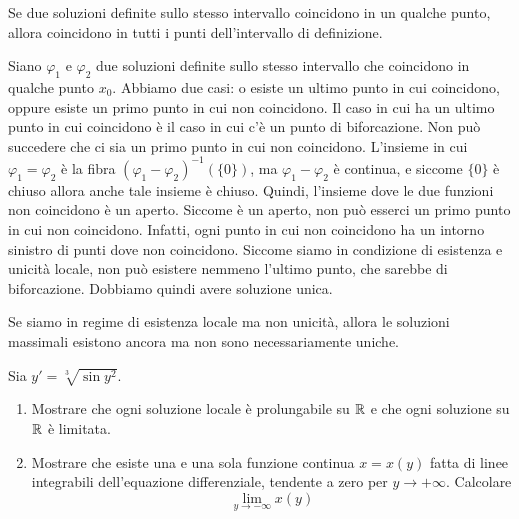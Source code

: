 \documentclass[a4paper]{article}
\begin{document}
\begin{snippetlemma}{}
    Se due soluzioni definite sullo stesso intervallo coincidono in un qualche punto,
    allora coincidono in tutti i punti dell'intervallo di definizione.
\end{snippetlemma}

\begin{snippetproof}{}
    Siano \(\varphi_1\) e \(\varphi_2\) due soluzioni definite sullo stesso intervallo che coincidono in qualche
    punto \(x_0\).
    Abbiamo due casi: o esiste un ultimo punto in cui coincidono, oppure esiste un primo punto in cui non coincidono.
    Il caso in cui ha un ultimo punto in cui coincidono è il caso in cui c'è un punto di biforcazione.
    Non può succedere che ci sia un primo punto in cui non coincidono.
    L'insieme in cui \(\varphi_1 = \varphi_2\)
    è la fibra \((\varphi_1 - \varphi_2)^{-1}(\{0\})\), ma \(\varphi_1 - \varphi_2\)
    è continua, e siccome \(\{0\}\) è chiuso allora anche tale insieme è chiuso.
    Quindi, l'insieme dove le due funzioni non coincidono è un aperto.
    Siccome è un aperto, non può esserci un primo punto in cui non coincidono.
    Infatti, ogni punto in cui non coincidono ha un intorno sinistro di punti dove non coincidono.
    Siccome siamo in condizione di esistenza e unicità locale, non può esistere nemmeno l'ultimo punto, che sarebbe
    di biforcazione. Dobbiamo quindi avere soluzione unica.
\end{snippetproof}

Se siamo in regime di esistenza locale ma non unicità, allora le soluzioni massimali esistono ancora
ma non sono necessariamente uniche.

\begin{snippetexercise}{}
    Sia \(y' = \sqrt[3]{\sin y^2}\).
    \begin{enumerate}
        \item Mostrare che ogni soluzione locale è prolungabile su \(\mathbb{R}\) e che ogni soluzione
        su \(\mathbb{R}\) è limitata.
        \item Mostrare che esiste una e una sola
        funzione continua \(x = x(y)\) fatta di linee integrabili
        dell'equazione differenziale, tendente a zero per \(y \to +\infty\).
        Calcolare \[
            \lim_{y \to -\infty} x(y)
        \]
    \end{enumerate}
\end{snippetexercise}
\end{document}
